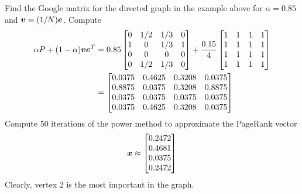 \begin{example}
Find the Google matrix for the directed graph in the example above for $\alpha = 0.85$ and $\boldsymbol{v} = (1/N) \boldsymbol{e}$. Compute
\begin{align*}
\alpha P + (1 - \alpha) \boldsymbol{v} \boldsymbol{e}^T &=
0.85 \begin{bmatrix} 0 & 1/2 & 1/3 & 0 \\ 1 & 0 & 1/3 & 1 \\ 0 & 0 & 0 & 0 \\ 0 & 1/2 & 1/3 & 0 \end{bmatrix}
+
\frac{0.15}{4}
\begin{bmatrix} 1 & 1 & 1 & 1 \\ 1 & 1 & 1 & 1 \\ 1 & 1 & 1 & 1 \\ 1 & 1 & 1 & 1 \end{bmatrix} \\
&=
\begin{bmatrix}
0.0375 & 0.4625 & 0.3208 & 0.0375 \\
0.8875 & 0.0375 & 0.3208 & 0.8875 \\
0.0375 & 0.0375 & 0.0375 & 0.0375 \\
0.0375 & 0.4625 & 0.3208 & 0.0375
\end{bmatrix}
\end{align*}
Compute 50 iterations of the power method to approximate the PageRank vector
$$
\boldsymbol{x} \approx \begin{bmatrix} 0.2472 \\ 0.4681 \\ 0.0375 \\ 0.2472 \end{bmatrix}
$$
Clearly, vertex 2 is the most important in the graph.
\end{example}
